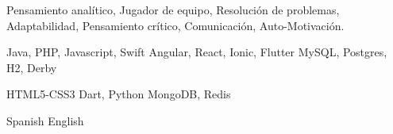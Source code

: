 
\begin{cvparagraph}
Pensamiento analítico, Jugador de equipo, Resolución de problemas, Adaptabilidad, Pensamiento crítico, Comunicación, Auto-Motivación.
\end{cvparagraph}

\begin{multicols}{3}
  \begin{cvskills}
    \cvskill
      {Java, PHP, Javascript, Swift} %
      {\faStar\faStar\faStar\faStar\faStarHalfEmpty} %
    \cvskill
      {Angular, React, Ionic, Flutter} %
      {\faStar\faStar\faStar\faStar\faStarHalfEmpty} %
    \cvskill
      {MySQL, Postgres, H2, Derby} %
      {\faStar\faStar\faStar\faStar\faStarHalfEmpty} %
  \end{cvskills}

  \columnbreak

  \begin{cvskills}
    \cvskill
      {HTML5-CSS3} %
      {\faStar\faStar\faStar\faStarHalfEmpty\faStarO} %
    \cvskill
      {{\hphantom{Empty}} Dart, Python} %
      {\faStar\faStar\faStar\faStarHalfEmpty\faStarO} %
    \cvskill
      {MongoDB, Redis} %
      {\faStar\faStar\faStar\faStarHalfEmpty\faStarO} %
  \end{cvskills}

  \columnbreak

  \begin{cvskills}
    \cvskill
      {Spanish} %
      {\faStar\faStar\faStar\faStar\faStar} %
    \cvskill
      {English} %
      {\faStar\faStar\faStar\faStarHalfEmpty\faStarO} %
  \end{cvskills}
\end{multicols}
